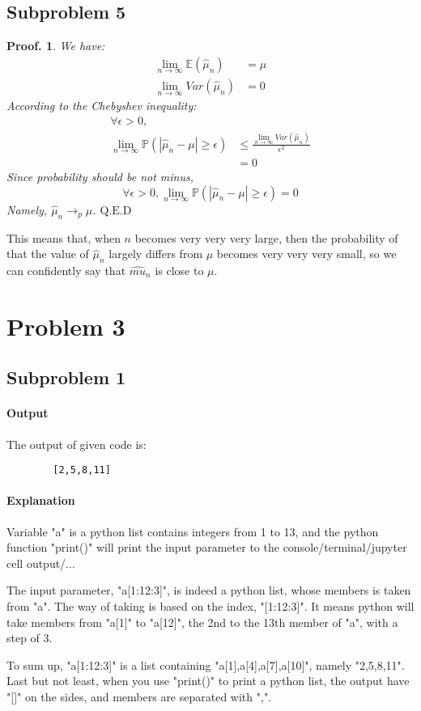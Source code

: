 \documentclass{article}
\theoremstyle{break}
\newtheorem*{proof_break}{Proof.}
\begin{document}
    \subsection{Subproblem 5}
    \begin{proof_break}
        We have:
        \begin{align*}
            \lim_{n\to\infty}\mathbb{E}(\hat{\mu}_n)&=\mu\\
            \lim_{n\to\infty}Var(\hat{\mu}_n)&=0
        \end{align*}
        According to the Chebyshev inequality:
        \begin{align*}
            \forall \epsilon > 0,&\\
            \lim_{n\to\infty}\mathbb{P}(|\hat{\mu}_n-\mu|\geq\epsilon)&\leq\frac{\lim_{n\to\infty}Var(\hat{\mu}_n)}{\epsilon^2}\\
            &=0
        \end{align*}
        Since probability should be not minus,
        $$\forall \epsilon > 0,
        \lim_{n\to\infty}\mathbb{P}(|\hat{\mu}_n-\mu|\geq\epsilon)=0$$
        Namely, $\hat{\mu}_n\to_{p}\mu$.
        \newline$\mathrm{Q.E.D}$
    \end{proof_break}
    This means that, when $n$ becomes very very very large, then the probability of that the value of $\hat{\mu}_n$ largely differs from $\mu$ becomes very very very small, so we can confidently say that $\hat{mu}_n$ is close to $\mu$. 
    \section{Problem 3}
    \subsection{Subproblem 1}
    \paragraph{Output}\par
    The output of given code is:
    \begin{lstlisting}
        [2,5,8,11]
    \end{lstlisting}
    \paragraph{Explanation}\par
    Variable "a" is a python list contains integers from 1 to 13, and the python function "print()" will print the input parameter to the console/terminal/jupyter cell output/... \par
    The input parameter, "a[1:12:3]", is indeed a python list,
    whose members is taken from "a". The way of taking is based on the index, "[1:12:3]". It means python will take members from "a[1]" to "a[12]", the 2nd to the 13th member of "a", with a step of 3. \par
    To sum up, "a[1:12:3]" is a list containing "a[1],a[4],a[7],a[10]", namely "2,5,8,11". Last but not least, when you use "print()" to print a python list, the output have "[]" on the sides, and members are separated with ",".
\end{document}
